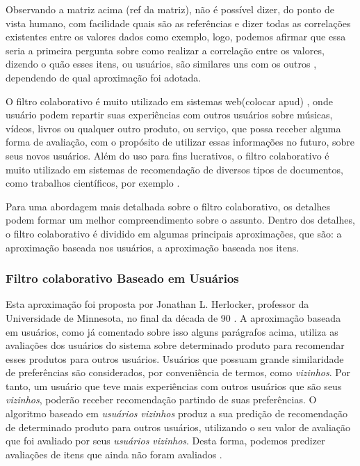 \documentclass[12pt,
				openright,
				twoside,
				a4paper,
				apter=TITLE,
				section=TITLE,
				subsection=TITLE,
				chapter=TITLE,
				english,
				brazil]{abntex2}
\begin{document}
Observando a matriz acima (ref da matriz), não é possível dizer, do ponto de vista humano, com facilidade quais são as referências e dizer todas as correlações existentes entre os valores dados como exemplo, logo, podemos afirmar que essa seria a primeira pergunta sobre como realizar a correlação entre os valores, dizendo o quão esses itens, ou usuários, são similares uns com os outros \cite{ricci2011introduction}, dependendo de qual aproximação foi adotada.

O filtro colaborativo é muito utilizado em sistemas web(colocar apud) \cite{turban2009electronic}, onde usuário podem repartir suas experiências com outros usuários sobre músicas, vídeos, livros ou qualquer outro produto, ou serviço, que possa receber alguma forma de avaliação, com o propósito de utilizar essas informações no futuro, sobre seus novos usuários. Além do uso para fins lucrativos, o filtro colaborativo é muito utilizado em sistemas de recomendação de diversos tipos de documentos, como trabalhos científicos, por exemplo \cite{sun2010new}. 

Para uma abordagem mais detalhada sobre o filtro colaborativo, os detalhes podem formar um melhor compreendimento sobre o assunto. Dentro dos detalhes, o filtro colaborativo é dividido em algumas principais aproximações, que são: a aproximação baseada nos usuários, a aproximação baseada nos itens. %


\subsubsection{Filtro colaborativo Baseado em Usuários}
Esta aproximação foi proposta por Jonathan L. Herlocker, professor da Universidade de Minnesota, no final da década de 90 \cite{sun2010new}. A aproximação baseada em usuários, como já comentado sobre isso alguns parágrafos acima, utiliza as avaliações dos usuários do sistema sobre determinado produto para recomendar esses produtos para outros usuários. Usuários que possuam grande similaridade de preferências são considerados, por conveniência de termos, como \textit{vizinhos}. Por tanto, um usuário que teve mais experiências com outros usuários que são seus \textit{vizinhos}, poderão receber recomendação partindo de suas preferências. O algoritmo baseado em \textit{usuários vizinhos} produz a sua predição de recomendação de determinado produto para outros usuários, utilizando o seu valor de avaliação que foi avaliado por seus \textit{usuários vizinhos}. Desta forma, podemos predizer avaliações de itens que ainda não foram avaliados \cite{zhao2010user}\cite{wang2006unifying}. 
\end{document}
